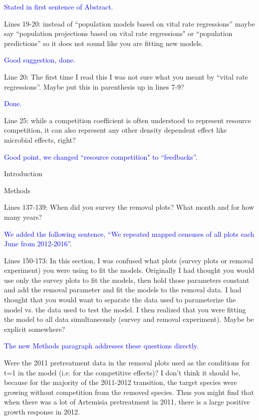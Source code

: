\documentclass[12pt]{article}
\newcommand{\response}{\textcolor{blue}}
\begin{document}
\response{Stated in first sentence of Abstract.}

Lines 19-20: instead of ``population models based on vital rate regressions'' maybe say ``population projections based on vital rate regressions" 
or ``population predictions'' so it does not sound like you are fitting new models. 

\response{Good suggestion, done.}

Line 20: The first time I read this I was not sure what you meant by ``vital rate regressions''. Maybe put this in parenthesis up in lines 7-9?

\response{Done.}

Line 25: while a competition coefficient is often understood to represent resource competition, it can also represent any other 
density dependent effect like microbial effects, right?

\response{Good point, we changed ``resource competition" to ``feedbacks''. }

Introduction

Methods

Lines 137-139:  When did you survey the removal plots? What month and for how many years? 

\response{We added the following sentence, ``We repeated mapped censuses of all plots each June from 2012-2016''.}

Lines 150-173: In this section, I was confused what plots (survey plots or removal experiment) you were using to fit the models. Originally I had thought you would use only the survey plots to fit the models, then hold those parameters constant and add the removal parameter and fit the models to the removal data. I had thought that you would want to separate the data used to parameterize the model vs. the data used to test the model. I then realized that you were fitting the model to all data simultaneously (survey and removal experiment). Maybe be explicit somewhere? 

\response{The new Methods paragraph addresses these questions directly.}

Were the 2011 pretreatment data in the removal plots used as the conditions for t=1 in the model (i.e. for the competitive effects)? I don’t think it should be, because for the majority of the 2011-2012 transition, the target species were growing without competition from the removed species. Thus you might find that when there was a lot of Artemisia pretreatment in 2011, there is a large positive growth response in 2012.
\end{document}
